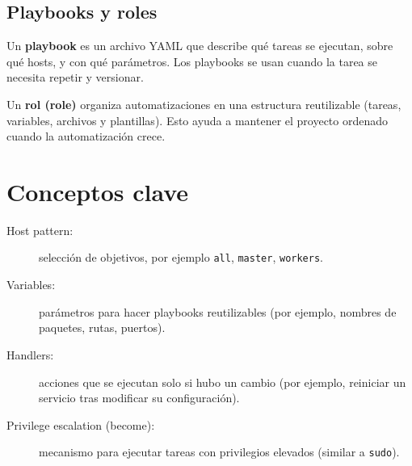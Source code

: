 \subsection{Playbooks y roles}
\label{subsec:ansible_playbooks_roles}

Un \textbf{playbook} es un archivo YAML que describe qué tareas se ejecutan, sobre qué hosts, y con qué parámetros. Los playbooks se usan cuando la tarea se necesita repetir y versionar. \cite{ansible_playbooks_intro}

Un \textbf{rol (role)} organiza automatizaciones en una estructura reutilizable (tareas, variables, archivos y plantillas). Esto ayuda a mantener el proyecto ordenado cuando la automatización crece.

\section{Conceptos clave}
\label{sec:ansible_conceptos}

\begin{description}
  \item[Host pattern:] selección de objetivos, por ejemplo \texttt{all}, \texttt{master}, \texttt{workers}.
  \item[Variables:] parámetros para hacer playbooks reutilizables (por ejemplo, nombres de paquetes, rutas, puertos). \cite{ansible_variables}
  \item[Handlers:] acciones que se ejecutan solo si hubo un cambio (por ejemplo, reiniciar un servicio tras modificar su configuración). \cite{ansible_modules_intro}
  \item[Privilege escalation (become):] mecanismo para ejecutar tareas con privilegios elevados (similar a \texttt{sudo}). \cite{ansible_become}
\end{description}

